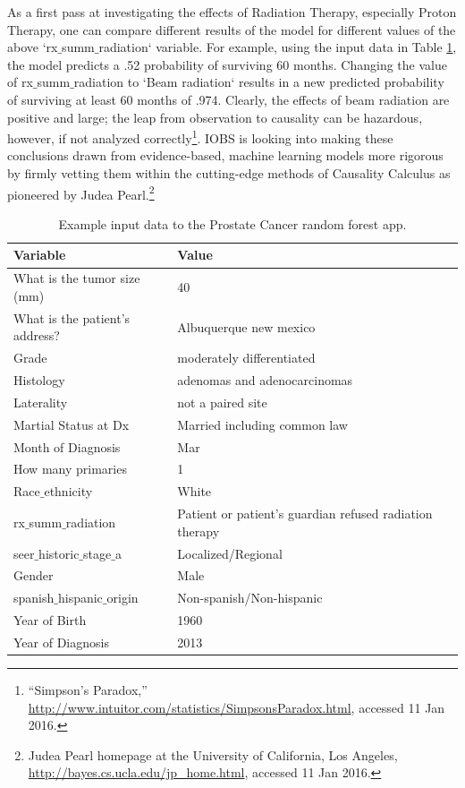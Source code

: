 \documentclass{article}
\begin{document}
As a first pass at investigating the effects of Radiation Therapy, especially Proton Therapy, one can compare different results of the model for different values of the above `rx$\_$summ$\_$radiation` variable. For example, using the input data in Table \ref{tab:abq}, the model predicts a .52 probability of surviving 60 months. Changing the value of rx$\_$summ$\_$radiation to `Beam radiation` results in a new predicted probability of surviving at least 60 months of .974.
Clearly, the effects of beam radiation are positive and large; the leap from observation to causality can be hazardous, however, if not analyzed correctly\footnote{``Simpson's Paradox,'' \url{http://www.intuitor.com/statistics/SimpsonsParadox.html}, accessed 11 Jan 2016.}. IOBS is looking into making these conclusions drawn from evidence-based, machine learning models more rigorous by firmly vetting them within the cutting-edge methods of Causality Calculus as pioneered by Judea Pearl.\footnote{Judea Pearl homepage at the University of California, Los Angeles, \url{http://bayes.cs.ucla.edu/jp_home.html}, accessed 11 Jan 2016.}





\begin{table}
\begin{center}
\begin{tabular}{| l | l|}
  \hline
  Variable  & Value \\ \hline
  What is the tumor size (mm) & 40 \\  \hline
  What is the patient's address? & Albuquerque new mexico \\ \hline
  Grade & moderately differentiated \\  \hline
  Histology & adenomas and adenocarcinomas \\ \hline
  Laterality & not a paired site \\  \hline
 Martial Status at Dx & Married including common law \\  \hline
 Month of Diagnosis & Mar \\  \hline
 How many primaries & 1 \\  \hline
  Race$\_$ethnicity & White \\  \hline
 rx$\_$summ$\_$radiation & Patient or patient's guardian refused radiation therapy \\
  seer$\_$historic$\_$stage$\_$a  & Localized/Regional \\ \hline
  Gender & Male \\  \hline
  spanish$\_$hispanic$\_$origin & Non-spanish/Non-hispanic \\ \hline
 Year of Birth & 1960 \\  \hline
  Year of Diagnosis & 2013 \\
\hline
\end{tabular}
\caption{Example input data to the Prostate Cancer random forest app.}
\label{tab:abq}
\end{center}
\end{table}
\end{document}
